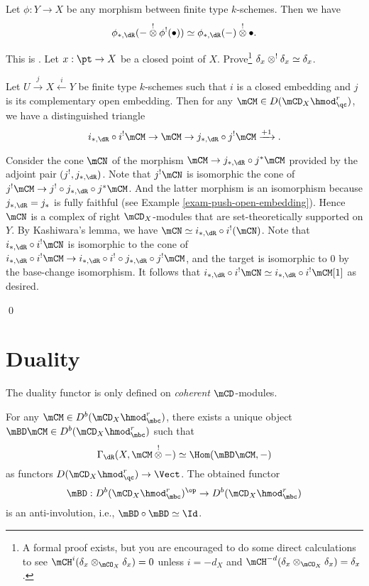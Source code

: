 	\begin{facts}
		Let $\phi: Y \to X$ be any morphism between finite type $k$-schemes. Then we have
		\[
			\phi_{*,\dR}( - \ot^! \phi^!(\bullet) ) \simeq \phi_{*,\dR}( -) \ot^! \bullet.
		\]
	\end{facts}

	\begin{exe}
		This is . Let $x:\pt \to X$ be a closed point of $X$. Prove\footnote{A formal proof exists, but you are encouraged to do some direct calculations to see $\mCH^i(\delta_x\ot_{\mCO_X} \delta_x)=0$ unless $i=-d_X$ and  $\mCH^{-d}(\delta_x\ot_{\mCO_X} \delta_x)=\delta_x$.} $\delta_x \ot^! \delta_x \simeq \delta_x$. 

	\end{exe}

	\begin{cor}
		Let $U \xrightarrow{j} X \xleftarrow{i} Y$ be finite type $k$-schemes such that $i$ is a closed embedding and $j$ is its complementary open embedding. Then for any $\mCM\in D( \mCD_X\hmod_\qc^r )$, we have a distinguished triangle
		\[
			i_{*,\dR}\circ i^! \mCM \to \mCM \to j_{*,\dR} \circ j^! \mCM \xrightarrow{+1}.
		\]
	\end{cor}

	\proof[Sketch]
		Consider the cone $\mCN$ of the morphism $\mCM \to j_{*,\dR} \circ j^* \mCM$ provided by the adjoint pair $(j^!,j_{*,\dR})$. Note that $j^!\mCN$ is isomorphic the cone of $j^!\mCM \to j^!\circ j_{*,\dR} \circ j^* \mCM$. And the latter morphism is an isomorphism because $j_{*,\dR}=j_*$ is fully faithful (see Example \ref{exam-push-open-embedding}). Hence $\mCN$ is a complex of right $\mCD_X$-modules that are set-theoretically supported on $Y$. By Kashiwara's lemma, we have $\mCN \simeq i_{*,\dR}\circ i^!(\mCN)$. Note that $i_{*,\dR}\circ i^!\mCN$ is isomorphic to the cone of $i_{*,\dR}\circ i^!\mCM \to i_{*,\dR}\circ i^!\circ  j_{*,\dR} \circ j^!\mCM$, and the target is isomorphic to $0$ by the base-change isomorphism. It follows that $i_{*,\dR}\circ i^!\mCN \simeq i_{*,\dR}\circ i^!\mCM [1]$ as desired.
 

	\qed
	
	
\section{Duality}

	The duality functor is only defined on \emph{coherent} $\mCD$-modules.

	\begin{facts}
		For any $\mCM\in D^b(\mCD_X\hmod_\mbc^r)$, there exists a unique object $\mBD \mCM \in D^b(\mCD_X\hmod_\mbc^r) $ such that
		\[
			\Gamma_\dR( X, \mCM \ot^! - ) \simeq \Hom( \mBD\mCM,- )
		\]
		as functors $D(\mCD_X\hmod_\qc^r) \to \Vect$. The obtained functor
		\[
			\mBD: D^b(\mCD_X\hmod_\mbc^r)^\op \to D^b(\mCD_X\hmod_\mbc^r)
		\]
		is an anti-involution, i.e., $\mBD\circ \mBD\simeq \Id$.

	\end{facts}

